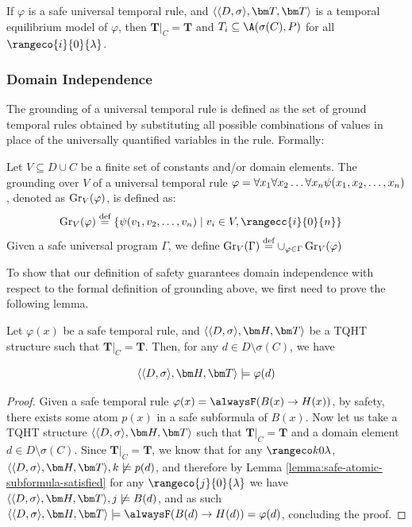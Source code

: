 \begin{theorem}
  If $\varphi$ is a safe universal temporal rule, and $\qttandt$ is a
  temporal equilibrium model of $\varphi$, then
  $\bm{T}\vert_{C}=\bm{T}$ and $T_i \subseteq \A(\sigma(C),P)$ for all
  $\rangeco{i}{0}{\lambda}$.
\end{theorem}

\subsubsection{Domain Independence}

The grounding of a universal temporal rule is defined as the set of
ground temporal rules obtained by substituting all possible
combinations of values in place of the universally quantified
variables in the rule. Formally:

\begin{definition}[Grounding]
  Let $V \subseteq D \cup C$ be a finite set of constants and/or
  domain elements. The grounding over $V$ of a universal temporal rule
  $\varphi = \forall x_1 \forall x_2 \dots \forall x_n \psi(x_1,x_2,\dots,x_n)$, denoted as
  $\operatorname{Gr}_{V}(\varphi)$, is defined as:
  \begin{align*}
    \ground{V}{\varphi} \defeq \{ &\psi(v_1,v_2,\dots,v_n) \mid v_i \in V, \rangecc{i}{0}{n}\}
  \end{align*}
  Given a safe universal program $\Gamma$, we define
  $\operatorname{Gr}_{V}(\Gamma) \stackrel{\text{def}}{=} \cup_{\varphi \in
    \Gamma}\operatorname{Gr}_{V}(\varphi)$
\end{definition}

To show that our definition of safety guarantees domain independence
with respect to the formal definition of grounding above, we first
need to prove the following lemma.

\begin{lemma}\label{lemma:not-imsigma-domain-sat}
  Let $\varphi(x)$ be a safe temporal rule, and $\qthandt$ be a
  TQHT structure such that $\bm{T}\vert_{C}=\bm{T}$. Then, for any
  $d \in D \setminus \sigma(C)$, we have

  \begin{equation*}
    \qthandt \models \varphi(d)
  \end{equation*}

\end{lemma}

\begin{proof}
  Given a safe temporal rule
  $\varphi(x) = \alwaysF(B(x) \rightarrow H(x))$, by safety, there
  exists some atom $p(x)$ in a safe subformula of $B(x)$. Now let us
  take a TQHT structure $\qthandt$ such that $\bm{T}\vert_{C}=\bm{T}$
  and a domain element $d \in D \setminus \sigma(C)$. Since
  $\bm{T}\vert_{C}=\bm{T}$, we know that for any $\kinlambda$,
  $\qthandt, k \not \models p(d)$, and therefore by Lemma
  \ref{lemma:safe-atomic-subformula-satisfied} for any
  $\rangeco{j}{0}{\lambda}$ we have $\qthandt,j \not \models B(d)$,
  and as such
  $\qthandt \models \alwaysF(B(d) \rightarrow H(d)) = \varphi(d)$,
  concluding the proof.
\end{proof}

